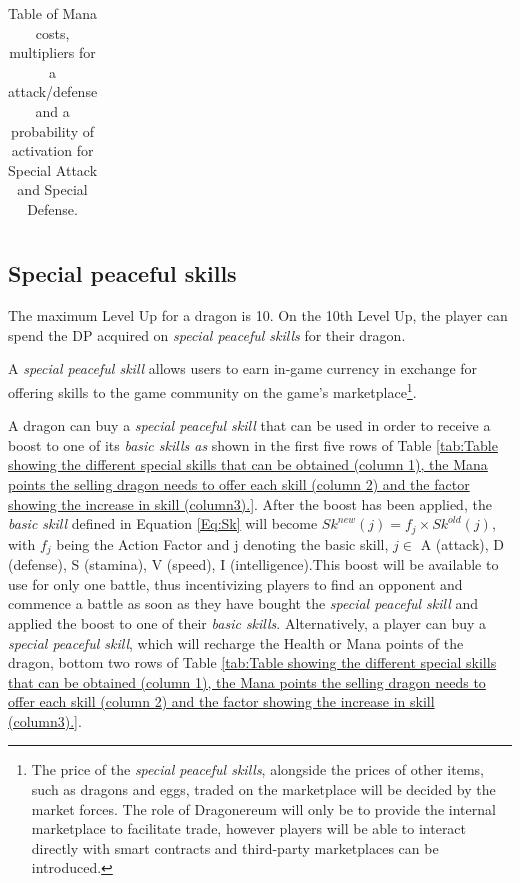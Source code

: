 \documentclass[12pt]{article}
\begin{document}
{\begin{table}[!ht]
\begin{tabular}{p{0.68in}p{0.88in}p{0.88in}p{0.88in}p{0.88in}p{0.88in}}
\end{tabular}\caption{Table of Mana costs, multipliers for a attack/defense and a probability of activation for Special Attack and Special Defense.}
\label{tab:Table of Mana costs, multipliers for a attack/defense and a probability of activation for Special Attack and Special Defense.}

 \end{table}




\subsection{Special peaceful skills}
\label{Special peaceful skills}  \par

The maximum Level Up for a dragon is 10. On the 10th Level Up, the player can spend the DP acquired on \textit{special peaceful skills} for their dragon.\par

A \textit{special peaceful skill} allows users to earn in-game currency in exchange for offering skills to the game community on the game’s marketplace\footnote{The price of the {\it special peaceful skills}, alongside the prices of other items, such as dragons and eggs, traded on the marketplace will be decided by the market forces. The role of Dragonereum will only be to provide the internal marketplace to facilitate trade, however players will be able to interact directly with smart contracts and third-party marketplaces can be introduced.}.\par

A dragon can buy a \textit{special peaceful skill} that can be used in order to receive a boost to one of its \textit{basic skills as }shown in the first five rows of  Table \ref{tab:Table showing the different special skills that can be obtained (column 1), the Mana points the selling dragon needs to offer each skill (column 2) and the factor showing the increase in skill (column3).}. After the boost has been applied, the \textit{basic skill }defined in Equation \ref{Eq:Sk} will become $Sk^{new}(j)=f_j\times Sk^{old}(j)$, with $f_j$ being the Action Factor and j denoting the basic skill, $j \in$  {A (attack), D (defense), S (stamina), V (speed), I (intelligence)}.This boost will be available to use for only one battle, thus incentivizing players to find an opponent and commence a battle as soon as they have bought the \textit{special peaceful skill }and applied the boost to one of their \textit{basic skills}. Alternatively, a player can buy a \textit{special peaceful skill}, which will recharge the Health or Mana points of the dragon, bottom two rows of  Table \ref{tab:Table showing the different special skills that can be obtained (column 1), the Mana points the selling dragon needs to offer each skill (column 2) and the factor showing the increase in skill (column3).}.\par

}
\end{document}
